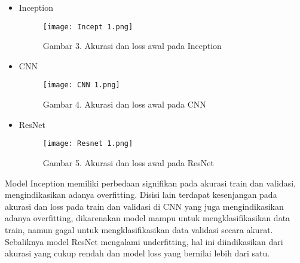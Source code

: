 \documentclass[12pt,a4paper]{article}
\begin{document}
\begin{itemize}
    \item Inception
    \begin{figure}[H]
        \centering
       \texttt{[image: Incept 1.png]}
        \caption*{Gambar 3. Akurasi dan loss awal pada Inception}
        \label{fig:enter-label}
    \end{figure}
\end{itemize}
\begin{itemize}
    \item CNN
    \begin{figure}[H]
        \centering
       \texttt{[image: CNN 1.png]}
        \caption*{Gambar 4. Akurasi dan loss awal pada CNN}
        \label{fig:enter-label}
    \end{figure}
\end{itemize}
\begin{itemize}
    \item ResNet
    \begin{figure}[H]
        \centering
       \texttt{[image: Resnet 1.png]}
        \caption*{Gambar 5. Akurasi dan loss awal pada ResNet}
        \label{fig:enter-label}
    \end{figure}
\end{itemize}
Model Inception memiliki perbedaan signifikan pada akurasi train dan validasi, mengindikasikan adanya overfitting. Disisi lain terdapat kesenjangan pada akurasi dan loss pada train dan validasi di CNN yang juga mengindikasikan adanya overfitting, dikarenakan model mampu untuk mengklasifikasikan data train, namun gagal untuk mengklasifikasikan data validasi secara akurat. Sebaliknya model ResNet mengalami underfitting, hal ini diindikasikan dari akurasi yang cukup rendah dan model loss yang bernilai lebih dari satu.
\end{document}
